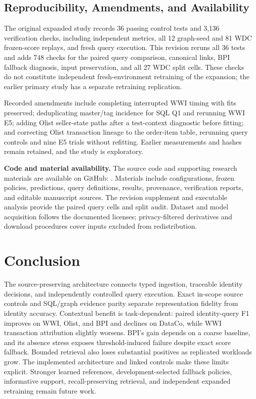 \documentclass[conference,letterpaper]{IEEEtran}
\begin{document}
\subsection{Reproducibility, Amendments, and Availability}
The original expanded study records 36 passing control tests and 3,136 verification checks, including independent metrics, all 12 graph-seed and 81 WDC frozen-score replays, and fresh query execution. This revision reruns all 36 tests and adds 748 checks for the paired query comparison, canonical links, BPI fallback diagnosis, input preservation, and all 27 WDC split cells. These checks do not constitute independent fresh-environment retraining of the expansion; the earlier primary study has a separate retraining replication.

Recorded amendments include completing interrupted WWI timing with fits preserved; deduplicating master/tag incidence for SQL Q1 and rerunning WWI E5; adding Olist seller-state paths after a test-context diagnostic before fitting; and correcting Olist transaction lineage to the order-item table, rerunning query controls and nine E5 trials without refitting. Earlier measurements and hashes remain retained, and the study is exploratory.

\textbf{Code and material availability.} The source code and supporting research materials are available on GitHub: \repositorylink. Materials include configurations, frozen policies, predictions, query definitions, results, provenance, verification reports, and editable manuscript sources. The revision supplement and executable analysis provide the paired query cells and split audit. Dataset and model acquisition follows the documented licenses; privacy-filtered derivatives and download procedures cover inputs excluded from redistribution.

\section{Conclusion}
The source-preserving architecture connects typed ingestion, traceable identity decisions, and independently controlled query execution. Exact in-scope source controls and SQL/graph evidence parity separate representation fidelity from identity accuracy. Contextual benefit is task-dependent: paired identity-query F1 improves on WWI, Olist, and BPI and declines on DataCo, while WWI transaction attribution slightly worsens. BPI's gain depends on a coarse baseline, and its absence stress exposes threshold-induced failure despite exact score fallback. Bounded retrieval also loses substantial positives as replicated workloads grow. The implemented architecture and linked controls make these limits explicit. Stronger learned references, development-selected fallback policies, informative support, recall-preserving retrieval, and independent expanded retraining remain future work.
\end{document}
